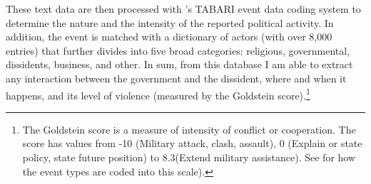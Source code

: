 \begin{itemize}
These text data are then processed with \citet{Schrodt2011}'s TABARI event data coding system to determine the nature and the intensity of the reported political activity. In addition, the event is matched with a dictionary of actors (with over 8,000 entries) that further divides into five broad categories: religious, governmental, dissidents, business, and other. In sum, from this database I am able to extract any interaction between the government and the dissident, where and when it happens, and its level of violence (measured by the Goldstein score).\footnote{The Goldstein score is a measure of intensity of conflict or cooperation. The score has values from -10 (Military attack, clash, assault), 0 (Explain or state policy, state future position) to 8.3(Extend military assistance). See \citet[375]{Goldstein1992} for how the event types are coded into this scale).}
\end{itemize}